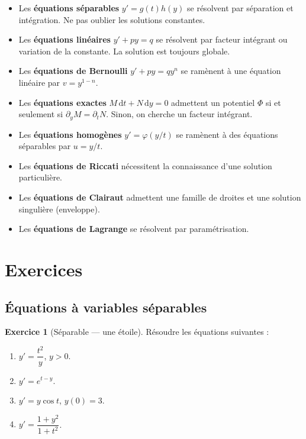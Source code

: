 \documentclass[12pt,a4paper,openany]{book}
\theoremstyle{definition}
\newtheorem{exercice}{Exercice}[chapter]
\theoremstyle{plain}
\theoremstyle{remark}
\newcommand{\dd}{\mathrm{d}}
\begin{document}
\begin{tcolorbox}[colback=blue!3,colframe=blue!50!black,title={\textbf{Résumé --- Chapitre 2}}]
\begin{itemize}[leftmargin=*]
\item Les \textbf{équations séparables} $y' = g(t)h(y)$ se résolvent par séparation et intégration. Ne pas oublier les solutions constantes.
\item Les \textbf{équations linéaires} $y' + py = q$ se résolvent par facteur intégrant ou variation de la constante. La solution est toujours globale.
\item Les \textbf{équations de Bernoulli} $y' + py = qy^n$ se ramènent à une équation linéaire par $v = y^{1-n}$.
\item Les \textbf{équations exactes} $M\,\dd t + N\,\dd y = 0$ admettent un potentiel $\Phi$ si et seulement si $\partial_y M = \partial_t N$. Sinon, on cherche un facteur intégrant.
\item Les \textbf{équations homogènes} $y' = \varphi(y/t)$ se ramènent à des équations séparables par $u = y/t$.
\item Les \textbf{équations de Riccati} nécessitent la connaissance d'une solution particulière.
\item Les \textbf{équations de Clairaut} admettent une famille de droites et une solution singulière (enveloppe).
\item Les \textbf{équations de Lagrange} se résolvent par paramétrisation.
\end{itemize}
\end{tcolorbox}

\section{Exercices}
\label{sec:exercices-ch2}

\subsection*{Équations à variables séparables}

\begin{exercice}[Séparable --- une étoile]
\label{exo:ch2-sep-1}
Résoudre les équations suivantes :
\begin{enumerate}[label=(\alph*)]
\item $y' = \dfrac{t^2}{y}$, $y > 0$.
\item $y' = e^{t-y}$.
\item $y' = y\cos t$, $y(0) = 3$.
\item $y' = \dfrac{1+y^2}{1+t^2}$.
\end{enumerate}
\end{exercice}
\end{document}
